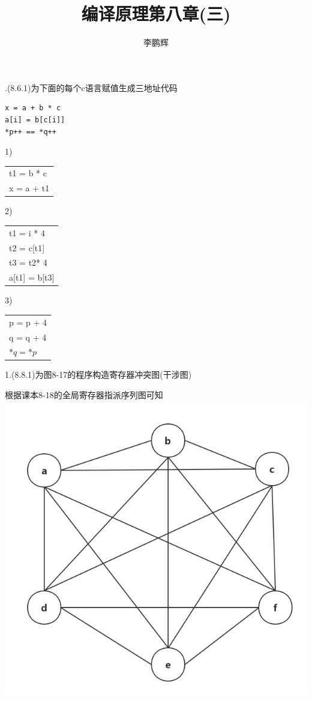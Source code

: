 \documentclass[a4paper, 16pt]{article}
\title{编译原理第八章(三)}
\author{李鹏辉}
\begin{document}
.(8.6.1)为下面的每个c语言赋值生成三地址代码
\lstset{language=C}
\begin{lstlisting}
x = a + b * c
a[i] = b[c[i]]
*p++ == *q++
\end{lstlisting}

1)
\begin{table}[H]
\centering
\begin{tabular}{l}
t1 = b * c\\
x = a + t1\\
\end{tabular}
\end{table}

2)
\begin{table}[H]
\centering
\begin{tabular}{l}
t1 = i * 4\\
t2 = c[t1]\\
t3 = t2* 4\\
a[t1] = b[t3]\\
\end{tabular}
\end{table}
3)
\begin{table}[H]
\centering
\begin{tabular}{l}
p = p + 4\\
q = q + 4\\
$*q = *p$\\
\end{tabular}
\end{table}

1.(8.8.1)为图8-17的程序构造寄存器冲突图(干涉图)

根据课本8-18的全局寄存器指派序列图可知\\
\includegraphics[scale=0.3]{chapter8_hw3_1}
\end{document}
